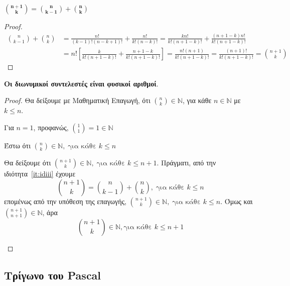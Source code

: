 \begin{enumerate}
  \item \label{it:idiii} 
    $ \bm{\binom{n+1}{k} = \binom{n}{k-1} + \binom{n}{k}} $
    \begin{proof}
      \begin{align*}
        \binom{n}{k-1} + \binom{n}{k} 
        &= \frac{n!}{(k-1)!(n-k+1)!} + \frac{n!}{k!(n-k)!} 
        = \frac{kn!}{k!(n+1-k)!} + \frac{(n+1-k)n!}{k!(n+1-k)!} \\
        &= n! \left[\frac{k}{k!(n+1-k)!} + \frac{n+1-k}{k!(n+1-k)!}\right] 
        = \frac{n!(n+1)}{k!(n+1-k)!} = \frac{(n+1)!}{k!(n+1-k)!} = 
        \binom{n+1}{k}
      \end{align*} 
    \end{proof}

  \item \textbf{Οι διωνυμικοί συντελεστές είναι φυσικοί αριθμοί}.
    \begin{proof}
    \item {}
      Θα δείξουμε με Μαθηματική Επαγωγή, ότι $ \binom{n}{k} \in \mathbb{N} $,
      για κάθε $ n \in \mathbb{N} $ με $ k \leq n $.
      \begin{myitemize}
        \item Για $ n=1 $, προφανώς, $ \binom{1}{1} = 1 \in \mathbb{N} $
        \item Έστω ότι $ \binom{n}{k} \in \mathbb{N}, \; \text{για κάθε } k \leq n $
        \item Θα δείξουμε ότι $ \binom{n+1}{k} \in \mathbb{N}, \; \text{για κάθε } 
          k \leq n+1$. Πράγματι, από την ιδιότητα~\ref{it:idiii} έχουμε
          \[
            \binom{n+1}{k} = \binom{n}{k-1} + \binom{n}{k}, \; \text{για κάθε } 
            k \leq n
          \]
          επομένως από την υπόθεση της επαγωγής, $ \textstyle{\binom{n+1}{k}} \in
          \mathbb{N}, \; \text{για κάθε } k \leq n $. Όμως και 
          $ \textstyle{\binom{n+1}{n+1} \in \mathbb{N}} $, άρα 
          \[
            \binom{n+1}{k} \in \mathbb{N}, \text{για κάθε } k \leq n+1 
          \] 
      \end{myitemize}
    \end{proof}
\end{enumerate}

\enlargethispage{2\baselineskip}

\subsection*{Τρίγωνο του Pascal}

